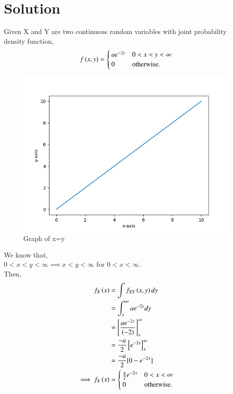 \documentclass[journal,12pt,twocolumn]{IEEEtran}
\begin{document}
\section{\textbf{Solution}}
Given X and Y are two continuous random variables with joint probability density function,
\begin{align}
f\left(x,y\right)= 
\begin{cases}
ae^{-2y} & 0<x<y<\infty \\
0 & \text{otherwise}.
\end{cases}   
\end{align}
\begin{figure}[!hbt]
    \centering
    \includegraphics[width=\columnwidth]{Figure_0.png}
    \caption{Graph of x=y}
    \label{Figure_1}
\end{figure}
We know that,\\
$0<x<y<\infty  \implies x<y<\infty \text{ for } 0<x<\infty.$\\ 
Then,
\begin{align}
    f_X\left(x\right) &= \int f_{XY}\left(x,y\right)dy\\
    &= \int_{x}^{\infty} ae^{-2y}dy\\
    &= \left[ \frac{ae^{-2y}}{(-2)} \right]_{x}^{\infty}\\
    &= \frac{-a}{2}\left[ e^{-2y}\right]_{x}^{\infty}\\
    &= \frac{-a}{2}[0-e^{-2x}]\\
\implies f_X\left(x\right) &=
    \begin{cases}
    \frac{a}{2}e^{-2x} & 0 < x < \infty\\
    0 & \text{otherwise}.
    \end{cases}
\end{align}
\end{document}
